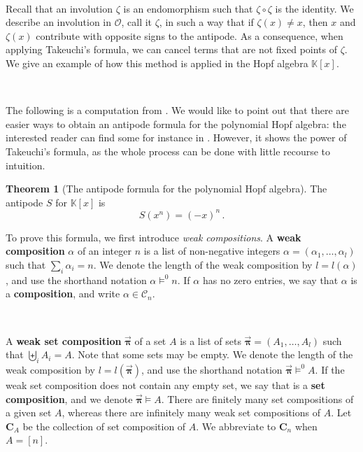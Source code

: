 \documentclass[12pt, reqno]{amsart}
\theoremstyle{definition}
\newtheorem{thm}{Theorem}[section]
\newcommand{\opi}{\vec{\boldsymbol{\pi}}}
\begin{document}
\

Recall that an involution $\zeta $ is an endomorphism such that $\zeta \circ \zeta$ is the identity.
We describe an involution in $\mathcal O$, call it $\zeta $, in such a way that if $\zeta(x) \neq x$, then $x$ and $\zeta(x)$ contribute with opposite signs to the antipode.
As a consequence, when applying Takeuchi's formula, we can cancel terms that are not fixed points of $\zeta$.
We give an example of how this method is applied in the Hopf algebra $\mathbb{K}[x]$.

\

The following is a computation from \cite{BS2017}.
We would like to point out that there are easier ways to obtain an antipode formula for the polynomial Hopf algebra: the interested reader can find some for instance in \cite{GrinbergReiner}.
However, it shows the power of Takeuchi’s formula, as the whole process can be done with little recourse to intuition.


\begin{thm}[The antipode formula for the polynomial Hopf algebra]\label{thm:polyHA}
The antipode $S$ for $\mathbb{K}[x] $ is 
$$ S(x^n) =(-x)^n\, . $$
\end{thm}

To prove this formula, we first introduce \textit{weak compositions}.
A \textbf{weak composition} $\alpha$ of an integer $n$ is a list of non-negative integers $\alpha = (\alpha_1, \dots , \alpha_l)$ such that $\sum_i \alpha_i = n$.
We denote the length of the weak composition by $l = l(\alpha)$, and use the shorthand notation $\alpha \models^0 n$.
If $\alpha $ has no zero entries, we say that $\alpha$ is a \textbf{composition}, and write $\alpha \in \mathcal C_n$.

\

A \textbf{weak set composition} $\opi$ of a set $A$ is a list of sets $\opi = (A_1, \dots , A_l)$ such that $\biguplus_i A_i = A$.
Note that some sets may be empty.
We denote the length of the weak composition by $l= l(\opi)$, and use the shorthand notation $\opi \models^0 A$.
If the weak set composition does not contain any empty set, we say that is a \textbf{set composition}, and we denote $\opi \models A$.
There are finitely many set compositions of a given set $A$, whereas there are infinitely many weak set compositions of $A$.
Let $\mathbf{C}_A$ be the collection of set composition of $A$.
We abbreviate to $\mathbf{C}_n$ when $A = [n]$.
\end{document}
